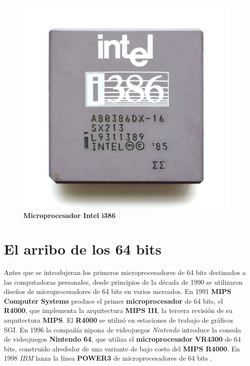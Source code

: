 \begin{figure}[htb]
	\centering
	\includegraphics[scale = 0.1]{Graphics/Intel_i386DX.jpg}
	\caption{\textbf{Microprocesador Intel i386}}
	\label{fig:18}
\end{figure}
\newpage

\section{El arribo de los 64 bits}
Antes que se introdujeran los primeros microprocesadores de 64 bits destinados a las computadoras personales, desde principios de la década de
1990 se utilizaron diseños de microprocesadores de 64 bits en varios mercados. En 1991 \textbf{MIPS Computer Systems} produce el primer \textbf
{microprocesador} de 64 bits, el \textbf{R4000}, que implementa la arquitectura \textbf{MIPS III}, la tercera revisión de su arquitectura \textbf{MIPS}.
El \textbf{R4000} se utilizó en estaciones de trabajo de gráficos SGI. En 1996 la compañía nipona de videojuegos \emph{Nintendo} introduce la consola de
videojuegos \textbf{Nintendo 64}, que utiliza el \textbf{microprocesador VR4300} de 64 bits, construido alrededor de una variante de bajo costo del
\textbf{MIPS R4000}. En 1998 \emph{IBM} lanza la línea \textbf{POWER3} de microprocesadores de 64 bits 
. 

